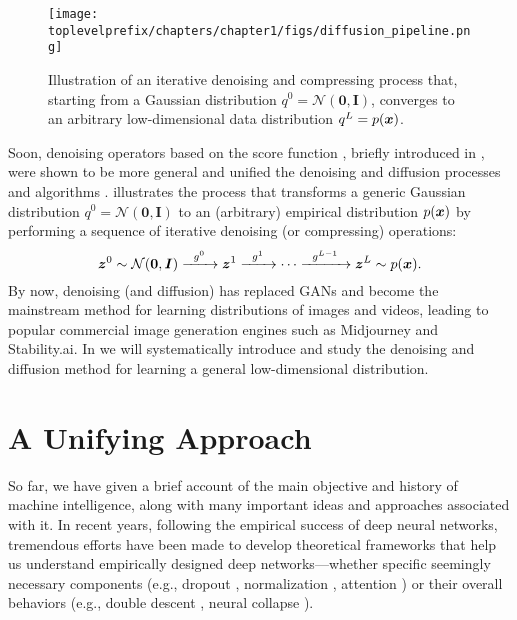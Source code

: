 \documentclass[../../book-main.tex]{subfiles}
\begin{document}
\begin{figure}[t]
    \centering
    \texttt{[image: \\toplevelprefix/chapters/chapter1/figs/diffusion\_pipeline.png]}
    \caption{Illustration of an iterative denoising and compressing process that, starting from a Gaussian distribution $q^0 = \mathcal{N}(\boldsymbol{0}, \boldsymbol{I})$, converges to an arbitrary low-dimensional data distribution $q^L = p(\bm{x})$.}
    \label{fig:diffusion}
\end{figure}

Soon, denoising operators based on the score function \cite{hyvarinen05a}, briefly introduced in , were shown to be more general and unified the denoising and diffusion processes and algorithms \cite{song2019,song2020score,ho2020denoising}.  illustrates the process that transforms a generic Gaussian distribution $q^0 = \mathcal{N}(\boldsymbol{0}, \boldsymbol{I})$ to an (arbitrary) empirical distribution $p(\bm{x})$ by performing a sequence of iterative denoising (or compressing) operations:
\begin{equation}
    \bm{z}^0 \sim  \mathcal{N}(\boldsymbol{0}, \boldsymbol{I})\xrightarrow{\hspace{2mm} g^0  \hspace{2mm}} \bm{z}^1 \xrightarrow{\hspace{2mm} g^1 \hspace{2mm}} \cdots \xrightarrow{\hspace{2mm} g^{L-1}  \hspace{2mm}} \bm{z}^L \sim p(\bm{x}).
\end{equation}
By now, denoising (and diffusion) has replaced GANs and become the mainstream method for learning distributions of images and videos, leading to popular commercial image generation engines such as Midjourney and Stability.ai. 
In  we will systematically introduce and study the denoising and diffusion method for learning a general low-dimensional distribution.


\section{A Unifying Approach}\label{sec:unifying-approach}
So far, we have given a brief account of the main objective and history of machine intelligence, along with many important ideas and approaches associated with it. In recent years, following the empirical success of deep neural networks, tremendous efforts have been made to develop theoretical frameworks that help us understand empirically designed deep networks---whether specific seemingly necessary components (e.g., dropout \cite{srivastava2014dropout}, normalization \cite{ioffe2015batch,ba2016layer}, attention \cite{vaswani2017attention}) or their overall behaviors (e.g., double descent \cite{belkin2019reconciling}, neural collapse \cite{papyan2020prevalence}).
\end{document}

